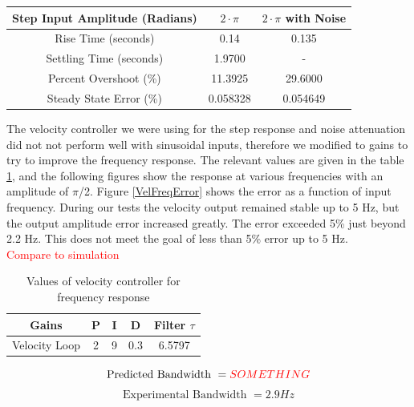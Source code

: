 \documentclass{article}
\newcommand{\xxx}[1]{\textcolor{red}{#1}}
\theoremstyle{plain}
\theoremstyle{definition}
\theoremstyle{remark}
\begin{document}
\begin{table}[htb]
\begin{center}
    \begin{tabular}{|c|c|c|}
        \hline
        Step Input Amplitude (Radians) & $2 \cdot \pi$ & $2 \cdot \pi$ with Noise \\ \hline
        Rise Time (seconds)            & 0.14          & 0.135                    \\ 
        Settling Time (seconds)        & 1.9700        &  -                    \\ 
        Percent Overshoot (\%)         & 11.3925       & 29.6000                  \\ 
        Steady State Error (\%)        & 0.058328      & 0.054649                 \\
        \hline
    \end{tabular}
\end{center}
\end{table}

The velocity controller we were using for the step response and noise attenuation did not not perform well with sinusoidal inputs, therefore we modified to gains to try to improve the frequency response. The relevant values are given in the table \ref{VelFreqGains}, and the following figures show the response at various frequencies with an amplitude of $\pi$/2. Figure \ref{VelFreqError} shows the error as a function of input frequency. During our tests the velocity output remained stable up to 5 Hz, but the output amplitude error increased greatly. The error exceeded 5\% just beyond 2.2 Hz. This does not meet the goal of less than 5\% error up to 5 Hz.\\

\xxx{Compare to simulation}

\begin{table}[htb]
\begin{center}
    \begin{tabular}{|c|c|c|c|c|}
        \hline
        Gains & P   & I & D     & Filter $\tau$   \\ \hline
        Velocity Loop       & 2   & 9    & 0.3   & 6.5797  \\ 
       \hline
    \end{tabular}
\end{center}
\caption{Values of velocity controller for frequency response}
\label{VelFreqGains}
\end{table}

$$\text{Predicted Bandwidth } =  \xxx{SOMETHING}$$
$$\text{Experimental Bandwidth } =  2.9 Hz$$
\end{document}
